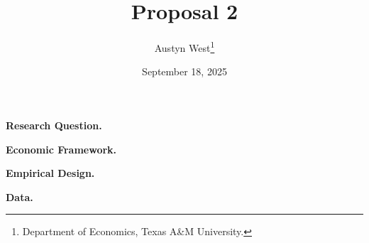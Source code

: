 

\begin{singlespace}
\title{Proposal 2}
\author{Austyn West\thanks{Department of Economics, Texas A\&M University.} }
\date{September 18, 2025}
\maketitle
\end{singlespace}

\textbf{Research Question.} 

\textbf{Economic Framework.} 

\textbf{Empirical Design.} 

\textbf{Data.} 


 

